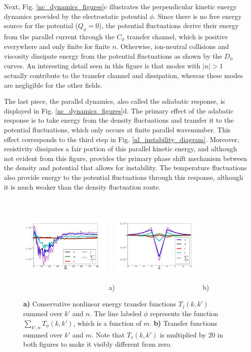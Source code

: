 \documentclass[twocolumn,showpacs,preprintnumbers,amsmath,amssymb]{revtex4}
\begin{document}
Next, Fig. \ref{nc_dynamics_figures}c illustrates the perpendicular kinetic energy dynamics provided by the electrostatic potential $\phi$. 
Since there is no free energy source for the potential ($Q_\phi=0$),
the potential fluctuations derive their energy from the parallel current through the $C_\phi$ transfer channel, which is positive everywhere and only finite for finite $n$. Otherwise, ion-neutral
collisions and viscosity dissipate energy from the potential fluctuations as shown by the $D_\phi$ curves. An interesting detail seen in this figure is that modes with $|n| > 1$ actually
contribute to the transfer channel and dissipation, whereas these modes are negligible for the other fields. 

The last piece, the parallel dynamics, also called the adiabatic response, is displayed in Fig. \ref{nc_dynamics_figures}d. 
The primary effect of the adabatic response is to take energy from the density
fluctuations and transfer it to the potential fluctuations, which only occurs at finite parallel wavenumber. This effect corresponds to the third step in Fig. \ref{nl_instability_diagram}.
Moreover, resistivity dissipates a fair portion of this parallel kinetic energy, and although not evident from this figure, provides
the primary phase shift mechanism between the density and potential that allows for instability. The temperature fluctuations also provide energy to the potential fluctuations
through this response, although it is much weaker than the density fluctuation route. 


\begin{figure}
\includegraphics[width=0.40\textwidth,height=50mm]{T_m}~a)
\hfil
\includegraphics[width=0.40\textwidth,height=50mm]{T_n}~b)
\hfil
\caption{\textbf{a)} Conservative nonlinear energy transfer functions $T_j(k,k')$ summed over $k'$ and $n$. The line labeled $\phi$ represents the function $\sum_{k',n} T_\phi(k,k')$,
which is a function of $m$. 
\textbf{b)} Transfer functions summed over $k'$ and $m$. Note that $T_v(k,k')$ is multiplied by $20$ in both figures to make it visibly different from zero.}
\label{conservative_transfers}
\end{figure}
\end{document}
